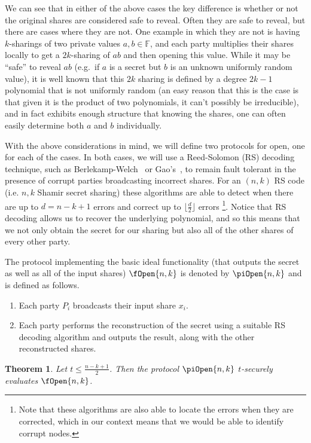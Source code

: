 \documentclass{article}
\newtheorem{theorem}{Theorem}
\theoremstyle{remark}
\newcommand{\F}{\mathbb{F}}
\begin{document}
We can see that in either of the above cases the key difference is whether or
not the original shares are considered safe to reveal. Often they are safe to
reveal, but there are cases where they are not. One example in which they are
not is having $k$-sharings of two private values $a, b \in \F$, and each party
multiplies their shares locally to get a $2k$-sharing of $ab$ and then opening
this value. While it may be ``safe'' to reveal $ab$ (e.g.\ if $a$ is a secret
but $b$ is an unknown uniformly random value), it is well known that this $2k$
sharing is defined by a degree $2k - 1$ polynomial that is not uniformly random
(an easy reason that this is the case is that given it is the product of two
polynomials, it can't possibly be irreducible), and in fact exhibits enough
structure that knowing the shares, one can often easily determine both $a$ and
$b$ individually.

With the above considerations in mind, we will define two protocols for open,
one for each of the cases. In both cases, we will use a Reed-Solomon (RS)
decoding technique, such as Berlekamp-Welch~\cite{welch_1986} or
Gao's~\cite{gao_2003}, to remain fault tolerant in the presence of corrupt
parties broadcasting incorrect shares. For an $(n, k)$ RS code (i.e. $n, k$
Shamir secret sharing) these algorithms are able to detect when there are up to
$d = n - k + 1$ errors and correct up to $\lfloor \frac{d}{2} \rfloor$ errors%
\footnote{%
	Note that these algorithms are also able to locate the errors when they are
	corrected, which in our context means that we would be able to identify
	corrupt nodes.
}.
Notice that RS decoding allows us to recover the underlying polynomial, and so
this means that we not only obtain the secret for our sharing but also all of
the other shares of every other party.

The protocol implementing the basic ideal functionality (that outputs the
secret as well as all of the input shares) $\fOpen{n,k}$ is denoted by
$\piOpen{n,k}$ and is defined as follows.

\begin{enumerate}
	\item Each party $P_i$ broadcasts their input share $x_i$.

	\item Each party performs the reconstruction of the secret using a suitable
		RS decoding algorithm and outputs the result, along with the other
		reconstructed shares.
\end{enumerate}

\begin{theorem}
	Let $t \le \frac{n - k + 1}{2}$. Then the protocol $\piOpen{n,k}$
	$t$-securely evaluates $\fOpen{n,k}$.
\end{theorem}
\end{document}
